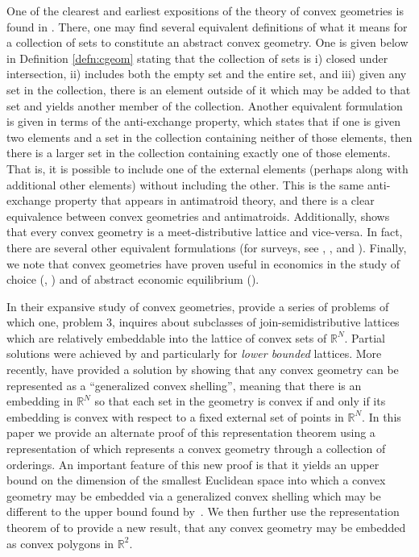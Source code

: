 \documentclass[12pt]{elsarticle}
\theoremstyle{plain}
\theoremstyle{definition}
\begin{document}
One of the clearest and earliest expositions of the theory of convex geometries is found in \cite{EJ}. There, one may find several equivalent definitions of what it means for a collection of sets to constitute an abstract convex geometry. One is given below in Definition \ref{defn:cgeom} stating that the collection of sets is i) closed under intersection, ii) includes both the empty set and the entire set, and iii) given any set in the collection, there is an element outside of it which may be added to that set and yields another member of the collection. Another equivalent formulation is given in terms of the anti-exchange property, which states that if one is given two elements and a set in the collection containing neither of those elements, then there is a larger set in the collection containing exactly one of those elements. That is, it is possible to include one of the external elements (perhaps along with additional other elements) without including the other. This is the same anti-exchange property that appears in antimatroid theory, and there is a clear equivalence between convex geometries and antimatroids. Additionally, \citet*{E80} shows that every convex geometry is a meet-distributive lattice and vice-versa. In fact, there are several other equivalent formulations (for surveys, see \citet*{S}, \citet*{AC}, \citet*{C14} and \citet*{AN}).  Finally, we note that convex geometries have proven useful in economics in the study of choice (\citet*{JD96,JD01,JD05}, \citet*{K}) and of abstract economic equilibrium (\citet*{RR}).

\medskip

In their expansive study of convex geometries, \citet*{AGT} provide a series of problems of which one, problem 3, inquires about subclasses of join-semidistributive lattices which are relatively embeddable into the lattice of convex sets of $\mathbb{R}^N$. Partial solutions were achieved by \citet*{A} and \citet*{WS} particularly for \emph{lower bounded} lattices. More recently, \cite{KNO} have provided a solution by showing that any convex geometry can be represented as a ``generalized convex shelling'', meaning that there is an embedding in $\mathbb{R}^N$ so that each set in the geometry is convex if and only if its embedding is convex with respect to a fixed external set of points in $\mathbb{R}^N$.  In this paper we provide an alternate proof of this representation theorem using a representation of \cite{EJ} which represents a convex geometry through a collection of orderings.  An important feature of this new proof is that it yields an upper bound on the dimension of the smallest Euclidean space into which a convex geometry may be embedded via a generalized convex shelling which may be different to the upper bound found by~\cite{KNO}. We then further use the representation theorem of \cite{EJ} to provide a new result, that any convex geometry may be embedded as convex polygons in $\mathbb{R}^2$.
	
\end{document}
